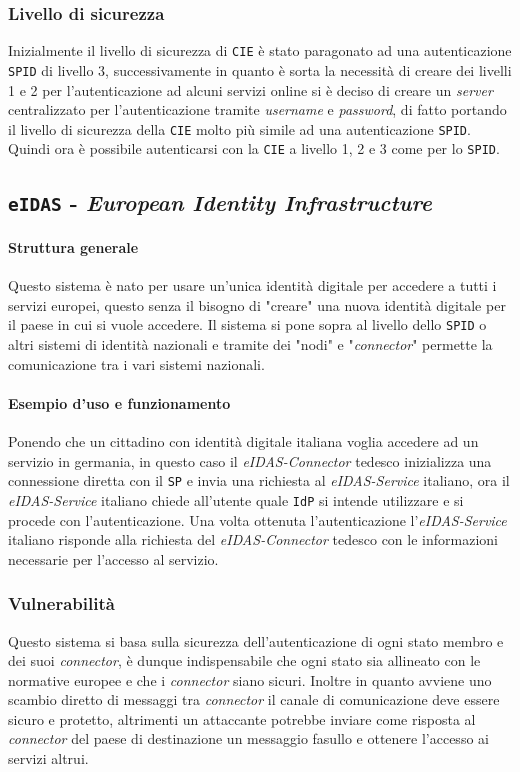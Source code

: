         \subsubsection{Livello di sicurezza} 
            Inizialmente il livello di sicurezza di \texttt{CIE} è stato paragonato ad una autenticazione \texttt{SPID} di livello 3, successivamente in quanto è sorta la necessità di creare dei livelli 1 e 2 per l'autenticazione ad alcuni servizi online si è deciso di creare un \textit{server} centralizzato per l'autenticazione tramite \textit{username} e \textit{password}, di fatto portando il livello di sicurezza della \texttt{CIE} molto più simile ad una autenticazione \texttt{SPID}. Quindi ora è possibile autenticarsi con la \texttt{CIE} a livello 1, 2 e 3 come per lo \texttt{SPID}.
    \subsection{\texttt{eIDAS} - \textit{European Identity Infrastructure}}
        \paragraph{Struttura generale} Questo sistema è nato per usare un'unica identità digitale per accedere a tutti i servizi europei, questo senza il bisogno di "creare" una nuova identità digitale per il paese in cui si vuole accedere. Il sistema si pone sopra al livello dello \texttt{SPID} o altri sistemi di identità nazionali e tramite dei "nodi" e "\textit{connector}" permette la comunicazione tra i vari sistemi nazionali. 
        \paragraph{Esempio d'uso e funzionamento} Ponendo che un cittadino con identità digitale italiana voglia accedere ad un servizio in germania, in questo caso il \textit{eIDAS-Connector} tedesco inizializza una connessione diretta con il \texttt{SP} e invia una richiesta al \textit{eIDAS-Service} italiano, ora il \textit{eIDAS-Service} italiano chiede all'utente quale \texttt{IdP} si intende utilizzare e si procede con l'autenticazione. Una volta ottenuta l'autenticazione l'\textit{eIDAS-Service} italiano risponde alla richiesta del \textit{eIDAS-Connector} tedesco con le informazioni necessarie per l'accesso al servizio.
        \subsubsection{Vulnerabilità}
            Questo sistema si basa sulla sicurezza dell'autenticazione di ogni stato membro e dei suoi \textit{connector}, è dunque indispensabile che ogni stato sia allineato con le normative europee e che i \textit{connector} siano sicuri. Inoltre in quanto avviene uno scambio diretto di messaggi tra \textit{connector} il canale di comunicazione deve essere sicuro e protetto, altrimenti un attaccante potrebbe inviare come risposta al \textit{connector} del paese di destinazione un messaggio fasullo e ottenere l'accesso ai servizi altrui.
